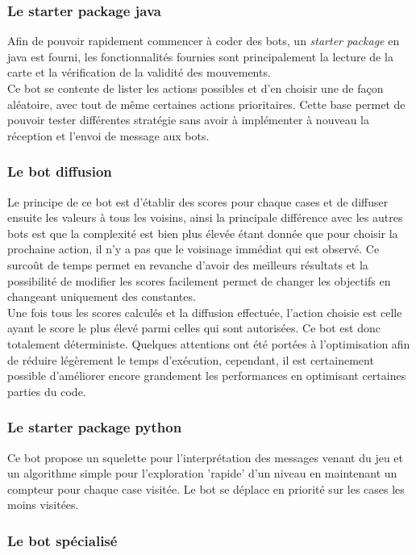 \documentclass[a4paper,12pt]{article}
\begin{document}
\subsubsection{Le starter package java}
Afin de pouvoir rapidement commencer à coder des bots, un \emph{starter package}
en java est fourni, les fonctionnalités fournies sont principalement la lecture
de la carte et la vérification de la validité des mouvements.
\\
Ce bot se contente de lister les actions possibles et d'en choisir une de façon
aléatoire, avec tout de même certaines actions prioritaires. Cette base permet
de pouvoir tester différentes stratégie sans avoir à implémenter à nouveau la
réception et l'envoi de message aux bots.

\subsubsection{Le bot diffusion}
Le principe de ce bot est d'établir des scores pour chaque cases et de diffuser
ensuite les valeurs à tous les voisins, ainsi la principale différence avec les
autres bots est que la complexité est bien plus élevée étant donnée que pour
choisir la prochaine action, il n'y a pas que le voisinage immédiat qui est
observé. Ce surcoût de temps permet en revanche d'avoir des meilleurs résultats
et la possibilité de modifier les scores facilement permet de changer les
objectifs en changeant uniquement des constantes.
\\
Une fois tous les scores calculés et la diffusion effectuée, l'action choisie
est celle ayant le score le plus élevé parmi celles qui sont autorisées. Ce bot
est donc totalement déterministe. Quelques attentions ont été portées à
l'optimisation afin de réduire légèrement le temps d'exécution, cependant, il
est certainement possible d'améliorer encore grandement les performances en
optimisant certaines parties du code.

\subsubsection{Le starter package python}

Ce bot propose un squelette pour l'interprétation des messages venant du jeu et un algorithme simple pour l'exploration 'rapide' d'un niveau en maintenant un compteur pour chaque case visitée. Le bot se déplace en priorité sur les cases les moins visitées.

\subsubsection{Le bot spécialisé}
\end{document}
